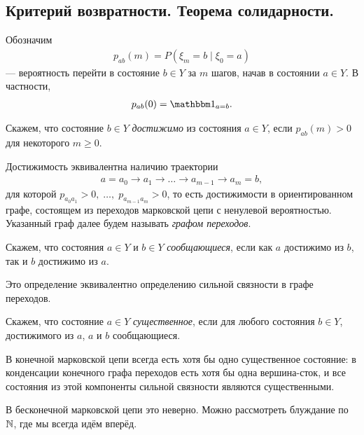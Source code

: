 \documentclass[../main.tex]{subfiles}
\begin{document}
\subsection{Критерий возвратности. Теорема солидарности.}

\begin{notatn*}
 Обозначим
 \begin{align*}
  p_{ab}(m) = P(\xi_m = b \mid \xi_0 = a)
 \end{align*} --- вероятность перейти в состояние $ b \in Y $ за $ m $ шагов, начав в состоянии $ a \in Y$. В частности,
 \begin{align*}
  p_{ab}(0) = \Ind_{a = b}.
 \end{align*}
\end{notatn*}

\begin{df}
 Скажем, что состояние $ b \in Y $ \textit{достижимо} из состояния $ a \in Y $, если $ p_{ab}(m) > 0 $ для некоторого $ m \geqslant 0 $.

 Достижимость эквивалентна наличию траектории
 \begin{align*}
  a = a_0 \to a_1 \to \ldots \to a_{m-1} \to a_m = b,
 \end{align*} для которой $ p_{a_0 a_1} > 0,\; \ldots,\; p_{a_{m-1} a_m} > 0 $, то есть достижимости в ориентированном графе, состоящем из переходов марковской цепи с ненулевой вероятностью. Указанный граф далее будем называть \textit{графом переходов}.
\end{df}

\begin{df}
 Скажем, что состояния $ a \in Y $ и $ b \in Y $ \textit{сообщающиеся}, если как $ a $ достижимо из $ b $, так и $ b $ достижимо из $ a $.

 Это определение эквивалентно определению сильной связности в графе переходов.
\end{df}

\begin{df}
 Скажем, что состояние $ a \in Y $ \textit{существенное}, если для любого состояния $ b \in Y $, достижимого из $ a $, $ a $ и $ b $ сообщающиеся.
\end{df}

\begin{remrk*}
 В конечной марковской цепи всегда есть хотя бы одно существенное состояние: в конденсации конечного графа переходов есть хотя бы одна вершина-сток, и все состояния из этой компоненты сильной связности являются существенными.

 В бесконечной марковской цепи это неверно. Можно рассмотреть блуждание по $ \mathbb{N} $, где мы всегда идём вперёд.
\end{remrk*}
\end{document}
